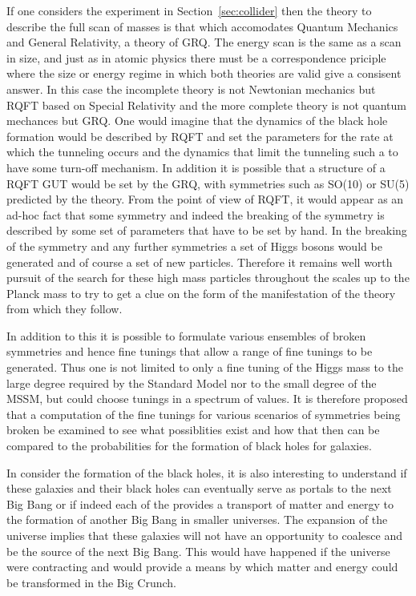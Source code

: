 \documentclass[a4paper]{article}
\begin{document}
If one considers the experiment in Section~\ref{sec:collider} then the theory to describe the full scan of
masses is that which accomodates Quantum Mechanics and General Relativity, a theory of GRQ. The energy scan 
is the same as a scan in size, and just as in atomic physics there must be a correspondence priciple where the
size or energy regime in which both theories are valid give a consisent answer. In this case the incomplete
theory is not Newtonian mechanics but RQFT based on Special Relativity and the more complete theory is not
quantum mechances but GRQ.   One would imagine that the dynamics of the black hole formation would be described
by  RQFT and set the parameters for the rate at which the tunneling occurs and the dynamics that limit the
tunneling such a to have some turn-off mechanism.  In addition it is possible that a structure of a RQFT GUT
would be set by the GRQ, with symmetries such as SO(10) or SU(5) predicted by the theory. From the point of view
of RQFT, it would appear as an ad-hoc fact that some symmetry and indeed the breaking of the symmetry is
described by some set of parameters that have to be set by hand.  In the breaking of the symmetry and any
further symmetries a set of Higgs bosons would be generated and of course a set of new particles.  Therefore 
it remains well worth pursuit of the search for these high mass particles throughout the scales up to the
Planck mass to try to get a clue on the form of the manifestation of the theory from which they follow.

In addition to this it is possible to formulate various ensembles of broken symmetries and hence fine tunings
that allow a range of fine tunings to be generated.  Thus one is not limited to only a fine tuning of the Higgs
mass to the large degree required by the Standard Model nor to the small degree of the MSSM, but could choose
tunings in a spectrum of values.   It is therefore proposed that a computation of the fine tunings for various
scenarios of symmetries being broken be examined to see what possiblities exist and how that then can be 
compared to the probabilities for the formation of black holes for galaxies.

In consider the formation of the black holes, it is also interesting to understand if these galaxies and their
black holes can eventually serve as portals to the next Big Bang or if indeed each of the provides
a transport of matter and energy to the formation of another Big Bang in smaller universes. The expansion
of the universe implies that these galaxies will not have an opportunity to coalesce and be the source of
the next Big Bang.  This would have happened if the universe were contracting and would provide a means by
which matter and energy could be transformed in the Big Crunch.
\end{document}
